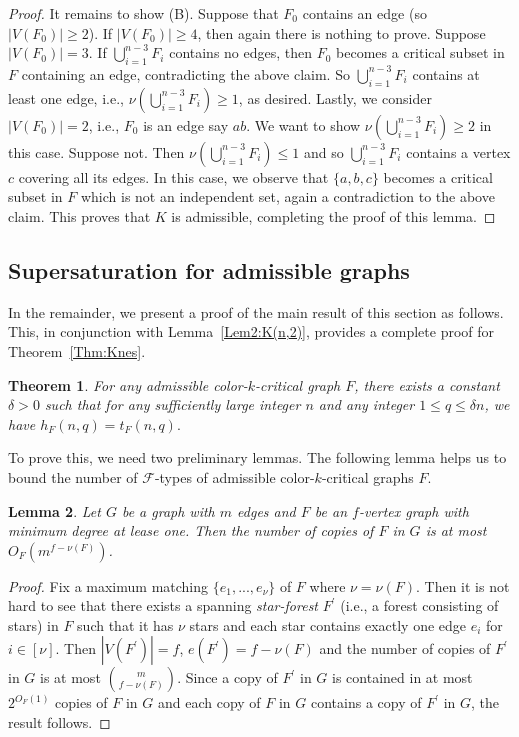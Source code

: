 \documentclass[10pt]{article}
\newtheorem{theorem}{Theorem}[section]
\newtheorem{lemma}[theorem]{Lemma}
\begin{document}
\begin{proof}
It remains to show (B). Suppose that $F_0$ contains an edge (so $|V(F_0)|\geq 2$).
If $|V(F_0)|\geq 4$, then again there is nothing to prove.
Suppose $|V(F_0)|=3$. If $\bigcup_{i=1}^{n-3}F_i$ contains no edges,
then $F_0$ becomes a critical subset in $F$ containing an edge, contradicting the above claim.
So $\bigcup_{i=1}^{n-3}F_i$ contains at least one edge, i.e., $\nu(\bigcup_{i=1}^{n-3}F_i)\geq 1$, as desired.
Lastly, we consider $|V(F_0)|=2$, i.e., $F_0$ is an edge say $ab$.
We want to show $\nu(\bigcup_{i=1}^{n-3}F_i)\geq 2$ in this case.
Suppose not. Then $\nu(\bigcup_{i=1}^{n-3}F_i)\leq 1$ and so $\bigcup_{i=1}^{n-3}F_i$ contains a vertex $c$ covering all its edges.
In this case, we observe that $\{a,b,c\}$ becomes a critical subset in $F$ which is not an independent set, again a contradiction to the above claim.
This proves that $K$ is admissible, completing the proof of this lemma.
\end{proof}

\subsection{Supersaturation for admissible graphs}
In the remainder, we present a proof of the main result of this section as follows.
This, in conjunction with Lemma~\ref{Lem2:K(n,2)}, provides a complete proof for Theorem~\ref{Thm:Knes}.

\begin{theorem}\label{Thm:adm}
For any admissible color-$k$-critical graph $F$, there exists a constant $\delta>0$ such that for any sufficiently large integer $n$ and any integer $1\leq q\leq \delta n$, we have
$h_F(n,q)=t_F(n,q).$
\end{theorem}

To prove this, we need two preliminary lemmas.
The following lemma helps us to bound the number of $\mathcal{F}$-types of admissible color-$k$-critical graphs $F$.

\begin{lemma}\label{bounded the numer of graph with given size}
Let $G$ be a graph with $m$ edges and $F$ be an $f$-vertex graph with minimum degree at lease one.
Then the number of copies of $F$ in $G$ is at most $O_F (m^{f-\nu(F)})$.
\end{lemma}
\begin{proof}
Fix a maximum matching $\{e_1,...,e_\nu\}$ of $F$ where $\nu=\nu(F)$.
Then it is not hard to see that there exists a spanning {\it star-forest} $F^\prime$ (i.e., a forest consisting of stars) in $F$ such that it has $\nu$ stars and each star contains exactly one edge $e_i$ for $i\in [\nu]$.
Then $|V(F^\prime)|=f$, $e(F^\prime)=f-\nu(F)$ and the number of copies of $F^\prime$ in $G$ is at most ${m \choose f-\nu(F)}$. Since a copy of $F^\prime$ in $G$ is contained in at most $2^{O_F(1)}$ copies of $F$ in $G$ and each copy of $F$ in $G$ contains a copy of $F^\prime$ in $G$, the result follows.
\end{proof}
\end{document}
